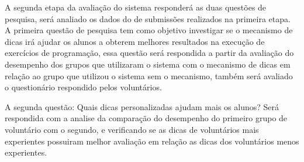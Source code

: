 A segunda etapa da avaliação do sistema responderá as duas questões de pesquisa, será analiado os dados do  de submissões realizados na primeira etapa. A primeira questão de pesquisa tem como objetivo investigar se o mecanismo de dicas irá ajudar os alunos a obterem melhores resultados na execução de exercícios de programação, essa questão será respondida a partir da avaliação do desempenho dos grupos que utilizaram o sistema com o mecanismo de dicas em relação ao grupo que utilizou o sistema sem o mecanismo,  também será avaliado o questionário respondido pelos voluntários.   

A segunda questão: Quais dicas personalizadas ajudam mais os alunos? Será respondida com a analise da comparação do desempenho do primeiro grupo de voluntário com o segundo, e verificando se as dicas de voluntários mais experientes possuiram melhor avaliação em relação as dicas dos voluntários menos experientes.